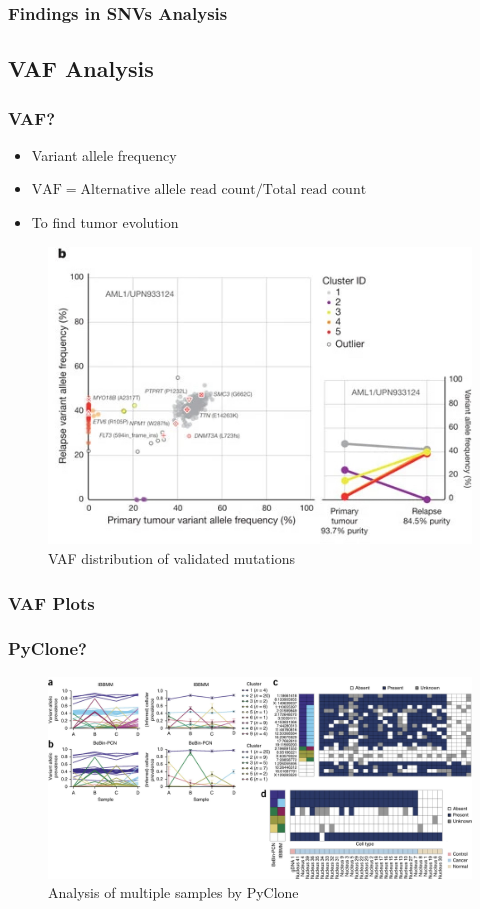 \documentclass{beamer}
\begin{document}
    \begin{frame}
        \frametitle{Findings in SNVs Analysis}
    \end{frame}

    \subsection{VAF Analysis}
    \begin{frame}
        \frametitle{VAF?}

        \begin{itemize}
            \item Variant allele frequency
            \item $\textrm{VAF} = \textrm{Alternative allele read count} / \textrm{Total read count}$
            \item To find tumor evolution
        \end{itemize}

        \begin{figure}
            \includegraphics[width=0.4 \linewidth]{figures/VAF/VAF.jpg}
            \caption{VAF distribution of validated mutations \protect\cite{VAF1}}
        \end{figure}
    \end{frame}

    \begin{frame}[allowframebreaks]
        \frametitle{VAF Plots}
    \end{frame}

    \begin{frame}
        \frametitle{PyClone?}

        \begin{figure}
            \includegraphics[width=0.8 \linewidth]{figures/Workflow/PyClone.jpg}
            \caption{Analysis of multiple samples by PyClone \protect\cite{pyclone1}}
        \end{figure}
    \end{frame}
\end{document}
